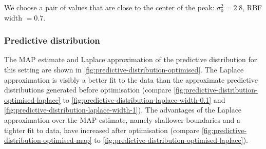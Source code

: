 \documentclass[a4paper]{article}
\begin{document}
    We choose a pair of values that are close to the center of the peak: $\sigma_0^2 = 2.8$, RBF width $= 0.7$.

    \subsubsection{Predictive distribution}
    The MAP estimate and Laplace approximation of the predictive distribution for this setting are shown in \autoref{fig:predictive-distribution-optimised}.
    The Laplace approximation is visibly a better fit to the data than the approximate predictive distributions generated before optimisation (compare \autoref{fig:predictive-distribution-optimised-laplace} to \autoref{fig:predictive-distribution-laplace-width-0.1} and \autoref{fig:predictive-distribution-laplace-width-1}).
    The advantages of the Laplace approximation over the MAP estimate, namely shallower boundaries and a tighter fit to data, have increased after optimisation (compare \autoref{fig:predictive-distribution-optimised-map} to \autoref{fig:predictive-distribution-optimised-laplace}).
\end{document}

